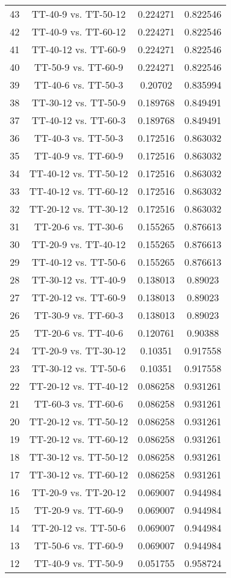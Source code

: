 \documentclass[a4paper,10pt]{article}
\begin{document}
\begin{landscape}
\begin{table}[!htp]
\begin{tabular}{cccc}
43&TT-40-9 vs. TT-50-12&0.224271&0.822546\\
42&TT-40-9 vs. TT-60-12&0.224271&0.822546\\
41&TT-40-12 vs. TT-60-9&0.224271&0.822546\\
40&TT-50-9 vs. TT-60-9&0.224271&0.822546\\
39&TT-40-6 vs. TT-50-3&0.20702&0.835994\\
38&TT-30-12 vs. TT-50-9&0.189768&0.849491\\
37&TT-40-12 vs. TT-60-3&0.189768&0.849491\\
36&TT-40-3 vs. TT-50-3&0.172516&0.863032\\
35&TT-40-9 vs. TT-60-9&0.172516&0.863032\\
34&TT-40-12 vs. TT-50-12&0.172516&0.863032\\
33&TT-40-12 vs. TT-60-12&0.172516&0.863032\\
32&TT-20-12 vs. TT-30-12&0.172516&0.863032\\
31&TT-20-6 vs. TT-30-6&0.155265&0.876613\\
30&TT-20-9 vs. TT-40-12&0.155265&0.876613\\
29&TT-40-12 vs. TT-50-6&0.155265&0.876613\\
28&TT-30-12 vs. TT-40-9&0.138013&0.89023\\
27&TT-20-12 vs. TT-60-9&0.138013&0.89023\\
26&TT-30-9 vs. TT-60-3&0.138013&0.89023\\
25&TT-20-6 vs. TT-40-6&0.120761&0.90388\\
24&TT-20-9 vs. TT-30-12&0.10351&0.917558\\
23&TT-30-12 vs. TT-50-6&0.10351&0.917558\\
22&TT-20-12 vs. TT-40-12&0.086258&0.931261\\
21&TT-60-3 vs. TT-60-6&0.086258&0.931261\\
20&TT-20-12 vs. TT-50-12&0.086258&0.931261\\
19&TT-20-12 vs. TT-60-12&0.086258&0.931261\\
18&TT-30-12 vs. TT-50-12&0.086258&0.931261\\
17&TT-30-12 vs. TT-60-12&0.086258&0.931261\\
16&TT-20-9 vs. TT-20-12&0.069007&0.944984\\
15&TT-20-9 vs. TT-60-9&0.069007&0.944984\\
14&TT-20-12 vs. TT-50-6&0.069007&0.944984\\
13&TT-50-6 vs. TT-60-9&0.069007&0.944984\\
12&TT-40-9 vs. TT-50-9&0.051755&0.958724\\

\end{tabular}
\end{table}
\end{landscape}
\end{document}
